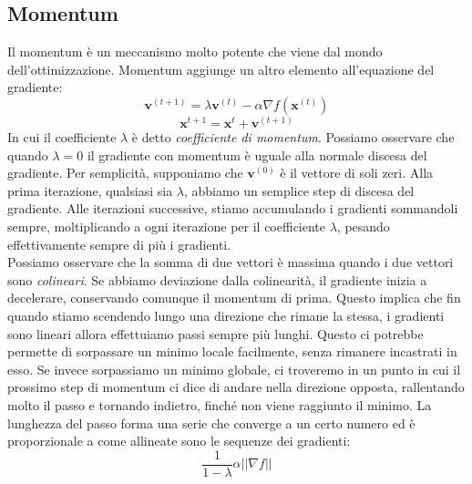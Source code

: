 \documentclass{article}
\begin{document}
        \subsection{Momentum}
            Il momentum è un meccanismo molto potente che viene dal mondo dell'ottimizzazione. Momentum aggiunge un altro 
            elemento all'equazione del gradiente:
                \[\mathbf{v}^{(t+1)} = \lambda \mathbf{v}^{(t)} - \alpha \nabla f(\mathbf{x}^{(t)})\]
                \[\mathbf{x}^{t+1} = \mathbf{x}^{t} + \mathbf{v}^{(t+1)}\]
            In cui il coefficiente $\lambda$ è detto \emph{coefficiente di momentum}. Possiamo osservare che quando $\lambda = 0$ 
            il gradiente con momentum è uguale alla normale discesa del gradiente. Per semplicità, supponiamo che 
            $\mathbf{v}^{(0)}$ è il vettore di soli zeri. Alla prima iterazione, qualsiasi sia $\lambda$, abbiamo un semplice step 
            di discesa del gradiente. Alle iterazioni successive, stiamo accumulando i gradienti sommandoli sempre, moltiplicando a 
            ogni iterazione per il coefficiente $\lambda$, pesando effettivamente sempre di più i gradienti. \\
            Possiamo osservare che la somma di due vettori è massima quando i due vettori sono \emph{colineari}. Se abbiamo deviazione 
            dalla colinearità, il gradiente inizia a decelerare, conservando comunque il momentum di prima. Questo implica che 
            fin quando stiamo scendendo lungo una direzione che rimane la stessa, i gradienti sono lineari allora 
            effettuiamo passi sempre più lunghi. Questo ci potrebbe permette di sorpassare un minimo locale facilmente, senza 
            rimanere incastrati in esso. Se invece sorpassiamo un minimo globale, ci troveremo in un punto in cui il prossimo step di 
            momentum ci dice di andare nella direzione opposta, rallentando molto il passo e tornando indietro, finché non viene 
            raggiunto il minimo. La lunghezza del passo forma una serie che converge a un certo numero ed è proporzionale a come 
            allineate sono le sequenze dei gradienti:
                \[\frac{1}{1-\lambda} \alpha ||\nabla f||\]
\end{document}
